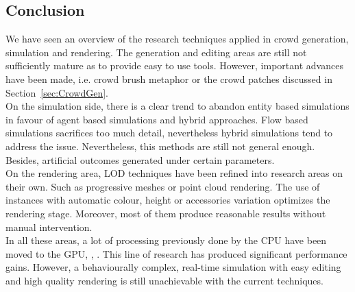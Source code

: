 \documentclass[6pt]{article} %
\begin{document}
\begin{multicols}{2}
\section{Conclusion}
We have seen an overview of the research techniques applied in crowd generation, simulation and rendering.
The generation and editing areas are still not sufficiently mature as to provide easy to use tools.
However, important advances have been made, i.e. crowd brush metaphor or the crowd patches discussed in Section~\ref{sec:CrowdGen}.\\

On the simulation side, there is a clear trend to abandon entity based simulations in favour of agent based simulations and hybrid approaches.
Flow based simulations sacrifices too much detail, nevertheless hybrid simulations tend to address the issue.
Nevertheless, this methods are still not general enough.
Besides, artificial outcomes generated under certain parameters.\\

On the rendering area, LOD techniques have been refined into research areas on their own.
Such as progressive meshes or point cloud rendering.
The use of instances with automatic colour, height or accessories variation optimizes the rendering stage.
Moreover, most of them produce reasonable results without manual intervention.\\

In all these areas, a lot of processing previously done by the CPU have been moved to the GPU, \cite{Hu2009}, \cite{Millan2006}.
This line of research has produced significant performance gains.
However, a behaviourally complex, real-time simulation with easy editing and high quality rendering is still unachievable with the current techniques.

\end{multicols}
\end{document}
